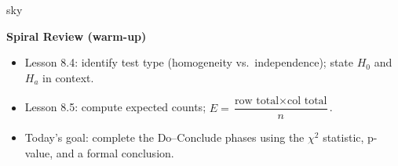 \documentclass[10pt]{article}
\begin{document}
\begin{skillbox}{sky}
\begin{minipage}[t]{0.55\linewidth}\vspace{0pt}
    \textbf{Spiral Review (warm-up)}
    \begin{itemize}
        \item Lesson 8.4: identify test type (homogeneity vs.\ independence);
              state $H_0$ and $H_a$ in context.
        \item Lesson 8.5: compute expected counts;
              $E = \dfrac{\text{row total} \times \text{col total}}{n}$.
        \item Today's goal: complete the Do--Conclude phases using the $\chi^2$
              statistic, p-value, and a formal conclusion.
    \end{itemize}
\end{minipage}
\hfill
\begin{minipage}[t]{0.38\linewidth}\vspace{0pt}\centering
\end{minipage}
\end{skillbox}
\end{document}
